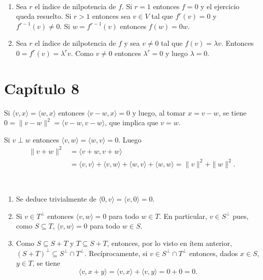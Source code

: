 \begin{solution}\
    \begin{enumerate}
        \item Sea $r$ el índice de nilpotencia de $f$. Si $r=1$ entonces $f=0$
            y el ejercicio queda resuelto. Si $r>1$ entonces sea $v\in V$ tal
            que $f^r(v)=0$ y $f^{r-1}(v)\ne0$. Si $w=f^{r-1}(v)$ entonces
            $f(w)=0w$. 
        \item Sea $r$ el índice de nilpotencia de $f$  y sea $v\ne0$ tal que
            $f(v)=\lambda v$. Entonces $0=f^r(v)=\lambda^rv$. Como $v\ne0$
            entonces $\lambda^r=0$ y luego $\lambda=0$.
    \end{enumerate}
\end{solution}

\section{Capítulo 8}

\begin{solution}[ejercicio~\ref{xca:<v-w,x>=0}]
	Si $\langle v,x\rangle=\langle w,x\rangle$ entonces $\langle
	v-w,x\rangle=0$ y luego, al tomar $x=v-w$, se tiene $0=\|v-w\|^2=\langle
	v-w,v-w\rangle$, que implica que $v=w$. 
\end{solution}

\begin{solution}
	Si $v\perp w$ entonces $\langle v,w\rangle=\langle w,v\rangle=0$. Luego
	\begin{align*}
		\|v+w\|^2&=\langle v+w,v+w\rangle\\
		&=\langle v,v\rangle+\langle v,w\rangle+\langle w,v\rangle+\langle w,w\rangle=\|v\|^2+\|w\|^2.
	\end{align*}
\end{solution}

\begin{solution}\
	\begin{enumerate}
		\item Se deduce trivialmente de $\langle 0,v\rangle=\langle v,0\rangle=0$.
		\item Si $v\in T^\perp$ entonces $\langle v,w\rangle=0$ para todo $w\in
			T$. En particular, $v\in S^\perp$ pues, como $S\subseteq T$,
			$\langle v,w\rangle=0$ para todo $w\in S$.
		\item Como $S\subseteq S+T$ y $T\subseteq S+T$, entonces, por lo visto
			en ítem anterior, $(S+T)^\perp\subseteq S^\perp\cap T^\perp$.
			Recíprocamente, si $v\in S^\perp\cap T^\perp$ entonces, dados $x\in
			S$, $y\in T$, se tiene 
			\[
			\langle v,x+y\rangle=\langle v,x\rangle+\langle v,y\rangle=0+0=0. 
			\]
	\end{enumerate}
\end{solution}

